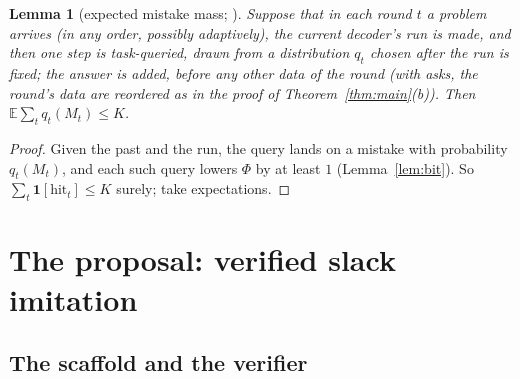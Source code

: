 \documentclass[11pt]{article}
\newtheorem{lemma}[theorem]{Lemma}
\theoremstyle{definition}
\theoremstyle{remark}
\newcommand{\K}{K}
\newcommand{\Ex}{\mathbb{E}}
\begin{document}
\begin{lemma}[expected mistake mass; \cite{note2}]\label{lem:mass}
Suppose that in each round $t$ a problem arrives (in any order, possibly adaptively), the current decoder's run is made, and then one step is task-queried, drawn from a distribution $q_t$ chosen after the run is fixed; the answer is added, before any other data of the round (with asks, the round's data are reordered as in the proof of Theorem~\ref{thm:main}(b)). Then $\Ex\sum_t q_t(M_t)\le\K$.
\end{lemma}
\begin{proof}
Given the past and the run, the query lands on a mistake with probability $q_t(M_t)$, and each such query lowers $\Phi$ by at least $1$ (Lemma~\ref{lem:bit}). So $\sum_t \mathbf 1[\text{hit}_t]\le\K$ surely; take expectations.
\end{proof}

\section{The proposal: verified slack imitation}\label{sec:scheme}

\subsection{The scaffold and the verifier}
\end{document}
